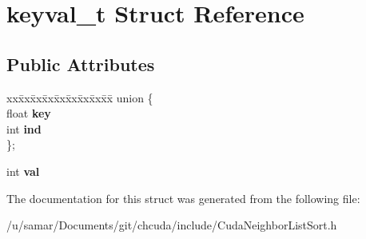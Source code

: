 \hypertarget{structkeyval__t}{}\section{keyval\+\_\+t Struct Reference}
\label{structkeyval__t}
\subsection*{Public Attributes}
\begin{DoxyCompactItemize}
\item 
\hypertarget{structkeyval__t_aa4c1b766401aad398453c07c3c5fe525}{}\label{structkeyval__t_aa4c1b766401aad398453c07c3c5fe525} 
\begin{tabbing}
xx\=xx\=xx\=xx\=xx\=xx\=xx\=xx\=xx\=\kill
union \{\\
\>float {\bfseries key}\\
\>int {\bfseries ind}\\
\}; \\

\end{tabbing}\item 
\hypertarget{structkeyval__t_a5c14a58a275bf5124f483e6e195c9736}{}\label{structkeyval__t_a5c14a58a275bf5124f483e6e195c9736} 
int {\bfseries val}
\end{DoxyCompactItemize}


The documentation for this struct was generated from the following file\+:\begin{DoxyCompactItemize}
\item 
/u/samar/\+Documents/git/chcuda/include/Cuda\+Neighbor\+List\+Sort.\+h\end{DoxyCompactItemize}
